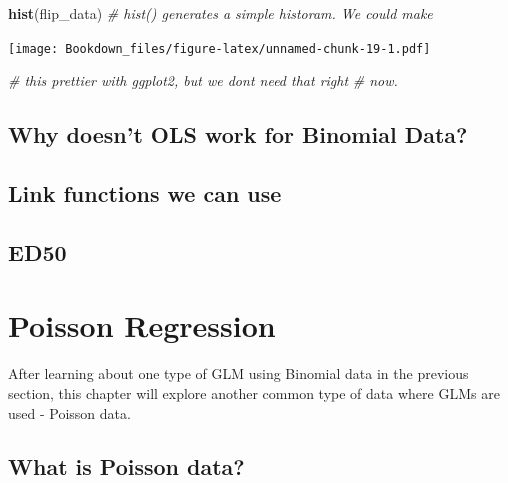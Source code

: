 \documentclass[
]{book}
\newenvironment{Shaded}{\begin{snugshade}}{\end{snugshade}}
\newcommand{\CommentTok}[1]{\textcolor[rgb]{0.56,0.35,0.01}{\textit{#1}}}
\newcommand{\KeywordTok}[1]{\textcolor[rgb]{0.13,0.29,0.53}{\textbf{#1}}}
\newcommand{\NormalTok}[1]{#1}
\begin{document}
\begin{Shaded}
\begin{Highlighting}[]
\KeywordTok{hist}\NormalTok{(flip\_data)         }\CommentTok{\# hist() generates a simple historam. We could make}
\end{Highlighting}
\end{Shaded}

\texttt{[image: Bookdown\_files/figure-latex/unnamed-chunk-19-1.pdf]}

\begin{Shaded}
\begin{Highlighting}[]
                        \CommentTok{\# this prettier with ggplot2, but we don\textquotesingle{}t need that right}
                        \CommentTok{\# now.}
\end{Highlighting}
\end{Shaded}

\hypertarget{why-doesnt-ols-work-for-binomial-data}{%
\section{Why doesn't OLS work for Binomial Data?}\label{why-doesnt-ols-work-for-binomial-data}}

\hypertarget{link-functions-we-can-use}{%
\section{Link functions we can use}\label{link-functions-we-can-use}}

\hypertarget{ed50}{%
\section{ED50}\label{ed50}}

\hypertarget{poisson-regression}{%
\chapter{Poisson Regression}\label{poisson-regression}}

After learning about one type of GLM using Binomial data in the previous section, this chapter will explore another common type of data where GLMs are used - Poisson data.

\hypertarget{what-is-poisson-data}{%
\section{What is Poisson data?}\label{what-is-poisson-data}}
\end{document}
